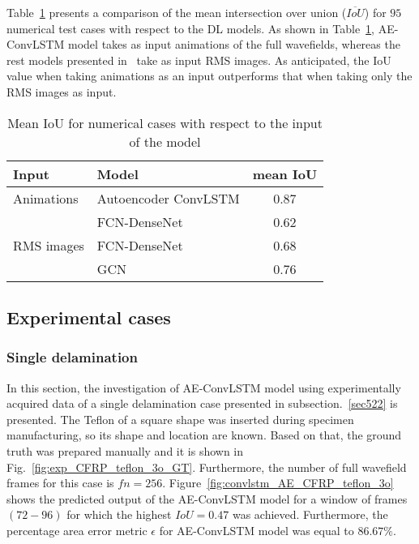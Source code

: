 Table~\ref{tab:meanIoU_vs_input} presents a comparison of the mean intersection over union (\(\overline{IoU}\)) for \(95\) numerical test cases with respect to the DL models.
As shown in Table~\ref{tab:meanIoU_vs_input}, AE-ConvLSTM model takes as input animations of the full wavefields, whereas the rest models presented in~\cite{Ijjeh2021, Ijjeh2022} take as input RMS images.
As anticipated, the IoU value when taking animations as an input outperforms that when taking only the RMS images as input. 
\begin{table}[!h]
	\centering
	\caption{Mean IoU for numerical cases with respect to the input of the model}
	\begin{tabular}{llc}
		\toprule
		Input & Model & mean IoU \\ 
		\midrule
		Animations & Autoencoder ConvLSTM & 0.87 \\ 
		\midrule
		\multirow{3}{*}{RMS images}  
		& FCN-DenseNet~\cite{Ijjeh2021} & 0.62   \\
		& FCN-DenseNet~\cite{Ijjeh2022} & 0.68   \\
		& GCN~\cite{Ijjeh2022}          & 0.76   \\ 
		\bottomrule
	\end{tabular}
	\label{tab:meanIoU_vs_input}
\end{table}
\clearpage
\subsection{Experimental cases}
\label{sec532}

\subsubsection{Single delamination}
\label{sec5321}
In this section, the investigation of AE-ConvLSTM model using experimentally acquired data of a single delamination case presented in subsection.~\ref{sec522} is presented. 
The Teflon of a square shape was inserted during specimen manufacturing, so its shape and location are known.
Based on that, the ground truth was prepared manually and it is shown in Fig.~\ref{fig:exp_CFRP_teflon_3o_GT}. 
Furthermore, the number of full wavefield frames for this case is \(fn = 256\).
Figure~\ref{fig:convlstm_AE_CFRP_teflon_3o} shows the predicted output of the AE-ConvLSTM model for a window of frames \((72-96)\) for which the highest \(IoU=0.47\) was achieved.
Furthermore, the percentage area error metric \(\epsilon\) for AE-ConvLSTM model was equal to \(86.67\%\).

